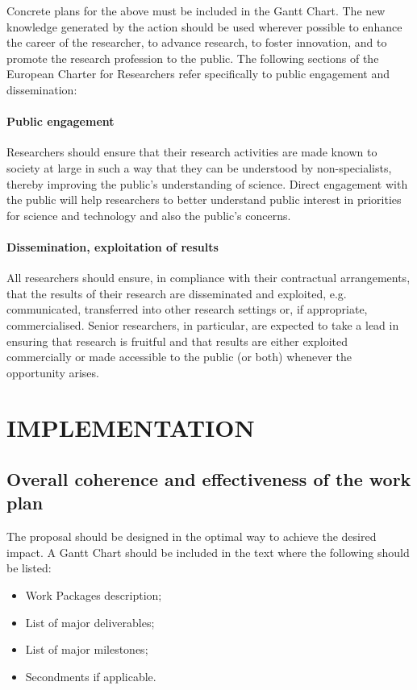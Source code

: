 \documentclass[a4paper,11pt]{article}
\begin{document}
Concrete plans for the above must be included in the Gantt Chart. The new knowledge generated by the action should be used wherever possible to enhance the career of the researcher, to advance research, to foster innovation, and to promote the research profession to the public. 
The following sections of the European Charter for Researchers refer specifically to public engagement and dissemination:

\paragraph{Public engagement}
Researchers should ensure that their research activities are made known to society at large in such a way that they can be understood by non-specialists, thereby improving the public's understanding of science. Direct engagement with the public will help researchers to better understand public interest in priorities for science and technology and also the public's concerns. 

\paragraph{Dissemination, exploitation of results}
All researchers should ensure, in compliance with their contractual arrangements, that the results of their research are disseminated and exploited, e.g. communicated, transferred into other research settings or, if appropriate, commercialised. Senior researchers, in particular, are expected to take a lead in ensuring that research is fruitful and that results are either exploited commercially or made accessible to the public (or both) whenever the opportunity arises. 


\section{IMPLEMENTATION}
\label{sec:implementation}

\subsection{Overall coherence and effectiveness of the work plan}

The proposal should be designed in the optimal way to achieve the desired impact. A Gantt Chart should be included in the text where the following should be listed:
\begin{itemize}
\item Work Packages description; 
\item List of major deliverables;    
\item List of major milestones;  
\item Secondments if applicable.
\end{itemize}
\end{document}
